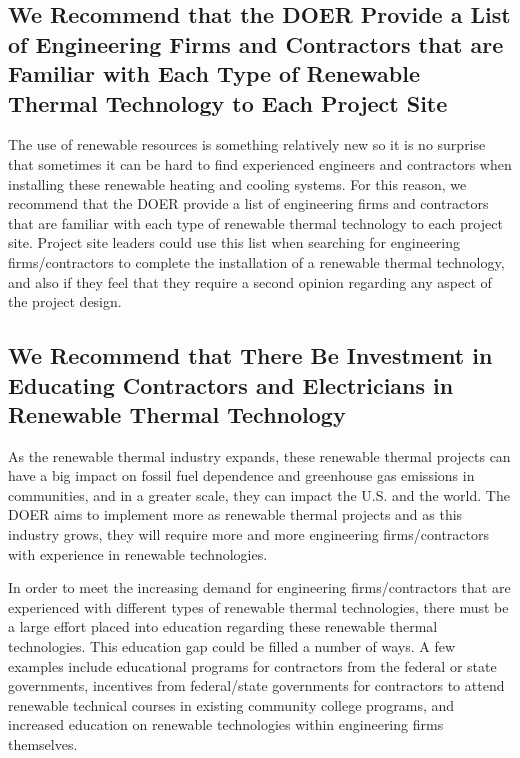 \subsection{We Recommend that the DOER Provide a List of Engineering Firms and Contractors that are Familiar with Each Type of Renewable Thermal Technology to Each Project Site}
\par The use of renewable resources is something relatively new so it is no surprise that sometimes it can be hard to find experienced engineers and contractors when installing these renewable heating and cooling systems. For this reason, we recommend that the DOER provide a list of engineering firms and contractors that are familiar with each type of renewable thermal technology to each project site. Project site leaders could use this list when searching for engineering firms/contractors to complete the installation of a renewable thermal technology, and also if they feel that they require a second opinion regarding any aspect of the project design.

\subsection{We Recommend that There Be Investment in Educating Contractors and Electricians in Renewable Thermal Technology}
\par As the renewable thermal industry expands, these renewable thermal projects can have a big impact on fossil fuel dependence and greenhouse gas emissions in communities, and in a greater scale, they can impact the U.S. and the world. The DOER aims to implement more as renewable thermal projects and as this industry grows, they will require more and more engineering firms/contractors with experience in renewable technologies.
\par In order to meet the increasing demand for engineering firms/contractors that are experienced with different types of renewable thermal technologies, there must be a large effort placed into education regarding these renewable thermal technologies. This education gap could be filled a number of ways. A few examples include educational programs for contractors from the federal or state governments, incentives from federal/state governments for contractors to attend renewable technical courses in existing community college programs, and increased education on renewable technologies within engineering firms themselves.

